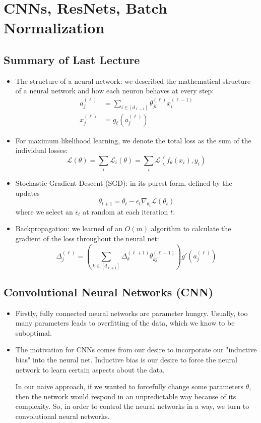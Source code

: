 \section{CNNs, ResNets, Batch Normalization}
\subsection{Summary of Last Lecture}
\begin{itemize}
	\item The structure of a neural network: we described the mathematical structure
		of a neural network and how each neuron behaves at every step:
		\begin{align*}
			a_j^{(\ell)} &= \sum_{i \in [d_{\ell - 1}]} \theta_{ji}^{(\ell)}x_i^{(\ell
			- 1)}\\
			x_j^{(\ell)} &= g_\ell(a_j^{(\ell)}) 
		\end{align*}
	\item For maximum likelihood learning, we denote the total loss as the sum of the
		individual losses: 
		\[
			\mathcal{L}(\theta) = \sum_i \mathcal{L}_i(\theta) = \sum_i
			\mathcal{L}(f_{\theta}(x_i), y_i)
		\]
	\item Stochastic Gradient Descent (SGD): in its purest form, defined by the
		updates
		\[
			\theta_{t + 1} = \theta_t - \epsilon_t
			\nabla_{\theta_t}\mathcal{L}(\theta_t)
		\]
		where we select an \( \epsilon_t \) at random at each iteration \( t \). 
	\item Backpropagation: we learned of an \( O(m) \) algorithm to calculate the
		gradient of the loss throughout the neural net:
		\[
			\Delta_j^{(\ell)} = \left( \sum_{k \in [d_{\ell + 1}]} \Delta_k^{(\ell +
			1)} \theta_{kj}^{(\ell + 1)} \right)g'(a_j^{(\ell)})
		\]
\end{itemize}
\subsection{Convolutional Neural Networks (CNN)}
\begin{itemize}
	\item Firstly, fully connected neural networks are parameter hungry. Usually,
		too many parameters leads to overfitting of the data, which we know to be
		suboptimal.
	\item The motivation for CNNs comes from our desire to incorporate our "inductive
		bias" into the neural net. Inductive bias is our desire to force the neural
		network to learn certain aspects about the data. 

		In our naive approach, if we wanted to forcefully change some parameters \(
		\theta \), then the network would respond in an unpredictable way because of
		its complexity. So, in order to control the neural networks in a way, we turn
		to convolutional neural networks.  
\end{itemize}


